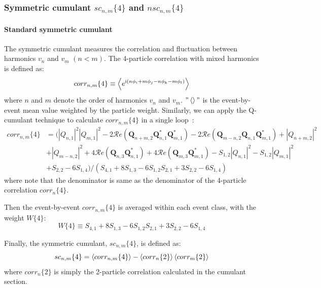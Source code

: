 \subsubsection{Symmetric cumulant $sc_{n,m}\{4\}$ and $nsc_{n,m}\{4\}$}
\paragraph{Standard symmetric cumulant}
The symmetric cumulant measures the correlation and fluctuation between harmonics $v_n$ and $v_m$ $(n<m)$. The 4-particle correlation with mixed harmonics is defined as:
\begin{equation}
corr_{n,m}\{4\}\equiv\left\langle e^{\text{i}(n\phi_i+m\phi_j-n\phi_k-m\phi_l)}\right\rangle
\end{equation}
where $n$ and $m$ denote the order of harmonics $v_n$ and $v_m$. $"\left\langle \right\rangle"$ is the event-by-event mean value weighted by the particle weight. Similarly, we can apply the Q-cumulant technique to calculate $corr_{n,m}\{4\}$ in a single loop~\cite{Jia:2017hbm}:
\begin{equation}
\begin{split}
corr_{n,m}\{4\}&=(|Q_{n,1}|^2|Q_{m,1}|^2-2\mathcal{R}\textit{e}(\pmb{Q}_{n+m,2}\pmb{Q}_{n,1}^*\pmb{Q}_{m,1}^*)-2\mathcal{R}\textit{e}(\pmb{Q}_{m-n,2}\pmb{Q}_{n,1}\pmb{Q}_{m,1}^*)+|Q_{n+m,2}|^2 \\
&+|Q_{m-n,2}|^2+4\mathcal{R}\textit{e}(\pmb{Q}_{n,3}\pmb{Q}_{n,1}^*)+4\mathcal{R}\textit{e}(\pmb{Q}_{m,3}\pmb{Q}_{m,1}^*)-S_{1,2}|Q_{n,1}|^2-S_{1,2}|Q_{m,1}|^2 \\
&+S_{2,2}-6S_{1,4})/(S_{4,1}+8S_{1,3}-6S_{1,2}S_{2,1}+3S_{2,2}-6S_{1,4})
\end{split}
\end{equation}
where note that the denominator is same as the denominator of the 4-particle correlation $corr_n\{4\}$.

Then the event-by-event $corr_{n,m}\{4\}$ is averaged within each event class, with the weight $W\{4\}$:
\begin{equation}
W\{4\}\equiv S_{4,1}+8S_{1,3}-6S_{1,2}S_{2,1}+3S_{2,2}-6S_{1,4}
\end{equation}

Finally, the symmetric cumulant, $sc_{n,m}\{4\}$, is defined as:
\begin{equation}
sc_{n,m}\{4\} = \left\langle corr_{n,m}\{4\}\right\rangle-\left\langle corr_n\{2\}\right\rangle\left\langle corr_m\{2\}\right\rangle
\end{equation}
where $corr_n\{2\}$ is simply the 2-particle correlation calculated in the cumulant section.

